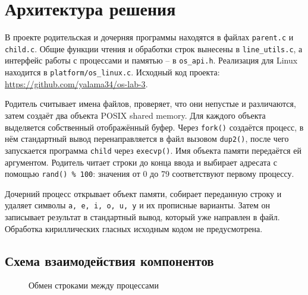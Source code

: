 \documentclass[12pt,a4paper]{article}
\begin{document}
\section{Архитектура решения}
В проекте родительская и дочерняя программы находятся в файлах \texttt{parent.c} и \texttt{child.c}. Общие функции чтения и обработки строк вынесены в \texttt{line\_utils.c}, а интерфейс работы с процессами и памятью -- в \texttt{os\_api.h}. Реализация для Linux находится в \texttt{platform/os\_linux.c}. Исходный код проекта: \url{https://github.com/yalama34/os-lab-3}.

Родитель считывает имена файлов, проверяет, что они непустые и различаются, затем создаёт два объекта POSIX shared memory. Для каждого объекта выделяется собственный отображённый буфер. Через \texttt{fork()} создаётся процесс, в нём стандартный вывод перенаправляется в файл вызовом \texttt{dup2()}, после чего запускается программа \texttt{child} через \texttt{execvp()}. Имя объекта памяти передаётся ей аргументом. Родитель читает строки до конца ввода и выбирает адресата с помощью \texttt{rand() \% 100}: значения от 0 до 79 соответствуют первому процессу.

Дочерний процесс открывает объект памяти, собирает переданную строку и удаляет символы \texttt{a, e, i, o, u, y} и их прописные варианты. Затем он записывает результат в стандартный вывод, который уже направлен в файл. Обработка кириллических гласных исходным кодом не предусмотрена.
\subsection{Схема взаимодействия компонентов}
\begin{figure}[H]\centering
{}
\caption{Обмен строками между процессами}
\end{figure}
\end{document}
